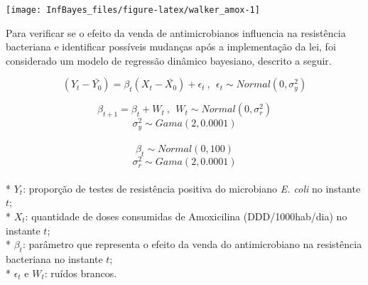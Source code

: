 \documentclass[
]{book}
\begin{document}
\begin{center}\texttt{[image: InfBayes\_files/figure-latex/walker\_amox-1]} \end{center}

Para verificar se o efeito da venda de antimicrobianos influencia na resistência
bacteriana e identificar possíveis mudanças após a implementação da lei, foi considerado um modelo de regressão dinâmico bayesiano, descrito a seguir.

\[(Y_t-\bar{Y_0}) = \beta_t (X_t-\bar{X_0}) + \epsilon_t ~,~~ \epsilon_t \sim Normal(0,\sigma_y^2)\]

\[\beta_{t+1} = \beta_t + W_t ~,~~ W_t \sim Normal(0,\sigma_r^2)\]
\[\sigma_y^2 \sim Gama(2,0.0001)\]\\
\[\beta_t \sim Normal(0,100)\]
\[\sigma_r^2 \sim Gama(2,0.0001)\]\\
* \(Y_t\): proporção de testes de resistência positiva do microbiano \emph{E. coli} no instante \(t\);\\
* \(X_t\): quantidade de doses consumidas de Amoxicilina (DDD/1000hab/dia) no instante \(t\);\\
* \(\beta_t\): parâmetro que representa o efeito da venda do antimicrobiano na resistência bacteriana no instante \(t\);\\
* \(\epsilon_t\) e \(W_t\): ruídos brancos.
\end{document}

